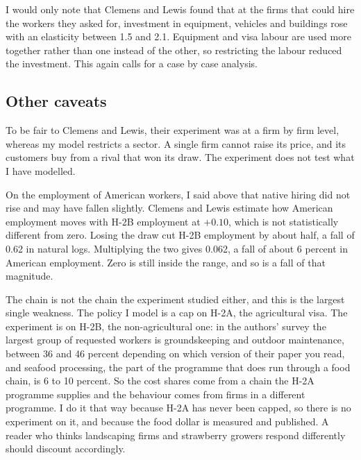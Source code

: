 \documentclass[11pt,a4paper]{article}
\begin{document}
I would only note that Clemens and Lewis found that at the firms that could hire the workers they asked for, investment in equipment, vehicles and buildings rose with an elasticity between 1.5 and 2.1. Equipment and visa labour are used more together rather than one instead of the other, so restricting the labour reduced the investment. This again calls for a case by case analysis.

\subsection{Other caveats}
\label{sec:caveats}

To be fair to Clemens and Lewis, their experiment was at a firm by firm level, whereas my model restricts a sector. A single firm cannot raise its price, and its customers buy from a rival that won its draw. The experiment does not test what I have modelled.

On the employment of American workers, I said above that native hiring did not rise and may have fallen slightly.  Clemens and Lewis estimate how American employment moves with H-2B employment at $+0.10$, which is not statistically different from zero. Losing the draw cut H-2B employment by about half, a fall of 0.62 in natural logs. Multiplying the two gives 0.062, a fall of about 6 percent in American employment. Zero is still inside the range, and so is a fall of that magnitude.

The chain is not the chain the experiment studied either, and this is the largest single weakness. The policy I model is a cap on H-2A, the agricultural visa. The experiment is on H-2B, the non-agricultural one: in the authors' survey the largest group of requested workers is groundskeeping and outdoor maintenance, between 36 and 46 percent depending on which version of their paper you read, and seafood processing, the part of the programme that does run through a food chain, is 6 to 10 percent. So the cost shares come from a chain the H-2A programme supplies and the behaviour comes from firms in a different programme. I do it that way because H-2A has never been capped, so there is no experiment on it, and because the food dollar is measured and published. A reader who thinks landscaping firms and strawberry growers respond differently should discount accordingly.
\end{document}
